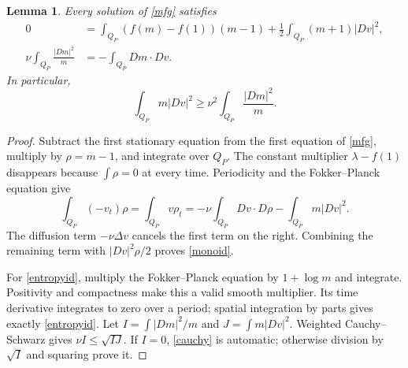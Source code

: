 \documentclass[11pt]{article}
\newtheorem{lemma}[theorem]{Lemma}
\begin{document}
\begin{lemma}\label{identities}
Every solution of \eqref{mfg} satisfies
\begin{align}
 0&=\int_{Q_P}(f(m)-f(1))(m-1)
       +\tfrac12\int_{Q_P}(m+1)|Dv|^2,\label{monoid}\\
 \nu\int_{Q_P}\frac{|Dm|^2}{m}
   &=-\int_{Q_P}Dm\cdot Dv.\label{entropyid}
\end{align}
In particular,
\begin{equation}\label{cauchy}
 \int_{Q_P}m|Dv|^2\geq\nu^2\int_{Q_P}\frac{|Dm|^2}{m}.
\end{equation}
\end{lemma}
\begin{proof}
Subtract the first stationary equation from the first equation of
\eqref{mfg}, multiply by $\rho=m-1$, and integrate over $Q_P$.
The constant multiplier $\lambda-f(1)$ disappears because $\int\rho=0$
at every time. Periodicity and the Fokker--Planck equation give
\[
 \int_{Q_P}(-v_t)\rho
 =\int_{Q_P}v\rho_t
 =-\nu\int_{Q_P}Dv\cdot D\rho-\int_{Q_P}m|Dv|^2.
\]
The diffusion term $-\nu\Delta v$ cancels the first term on the right.
Combining the remaining term with $|Dv|^2\rho/2$ proves
\eqref{monoid}.

For \eqref{entropyid}, multiply the Fokker--Planck equation by
$1+\log m$ and integrate. Positivity and compactness make this a valid
smooth multiplier. Its time derivative integrates to zero over a period;
spatial integration by parts gives exactly \eqref{entropyid}.
Let $I=\int|Dm|^2/m$ and $J=\int m|Dv|^2$.
Weighted Cauchy--Schwarz gives $\nu I\leq\sqrt{IJ}$.
If $I=0$, \eqref{cauchy} is automatic; otherwise division by
$\sqrt I$ and squaring prove it.
\end{proof}
\end{document}
